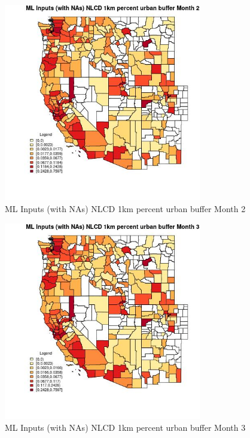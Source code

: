 \begin{figure} 
\centering  
\includegraphics[width=0.77\textwidth]{Code_Outputs/Report_ML_input_PM25_Step4_part_f_de_duplicated_aveswNAs_CountyNLCD_1km_percent_urban_buffermedianMonth2.jpg} 
\caption{\label{fig:Report_ML_input_PM25_Step4_part_f_de_duplicated_aveswNAsCountyNLCD_1km_percent_urban_buffermedianMonth2}ML Inputs (with NAs) NLCD 1km percent urban buffer Month 2} 
\end{figure} 
 

\begin{figure} 
\centering  
\includegraphics[width=0.77\textwidth]{Code_Outputs/Report_ML_input_PM25_Step4_part_f_de_duplicated_aveswNAs_CountyNLCD_1km_percent_urban_buffermedianMonth3.jpg} 
\caption{\label{fig:Report_ML_input_PM25_Step4_part_f_de_duplicated_aveswNAsCountyNLCD_1km_percent_urban_buffermedianMonth3}ML Inputs (with NAs) NLCD 1km percent urban buffer Month 3} 
\end{figure} 
 

